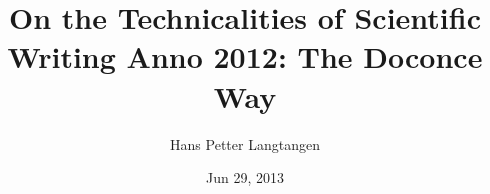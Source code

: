 \documentclass{beamer}
\begin{document}







\title{On the Technicalities of Scientific Writing Anno 2012: The Doconce Way}

\author{Hans Petter Langtangen}


\date{Jun 29, 2013
}

\begin{frame}
\titlepage
\end{frame}
\end{document}
